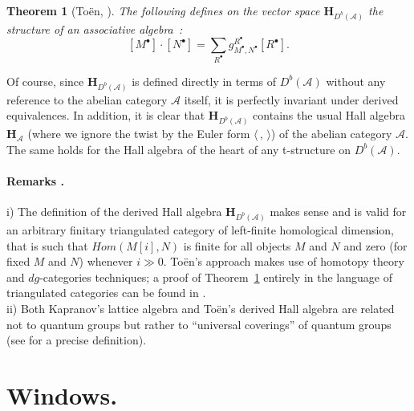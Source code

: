 \documentclass[a4paper,10pt]{amsart}
\def\H{\mathbf{H}}
\def\A{\mathcal{A}}
\newtheorem{theo}{\bf{Theorem}}[section]
\numberwithin{equation}{section}
\begin{document}
{\vspace{.1in}

\begin{theo}[To\"en, \cite{Toen}]\label{T:TOEN} The following defines on the vector space $\H_{D^b(\A)}$ the structure of an associative algebra~:
$$[M^{\bullet}] \cdot [N^{\bullet}]=\sum_{R^{\bullet}} g_{M^{\bullet},N^{\bullet}}^{R^{\bullet}}[R^{\bullet}].$$
\end{theo}

\vspace{.1in}

Of course, since $\H_{D^b(\A)}$ is defined directly in terms of $D^b(\A)$ without any reference to
the abelian category $\A$ itself, it is perfectly invariant under derived equivalences. In addition, it is clear that $\H_{D^b(\A)}$ contains the usual Hall algebra $\H_{\A}$ (where we ignore the twist by the Euler form $\langle\,,\,\rangle$) of the abelian category $\A$. The same holds for the Hall algebra of the heart of any t-structure on $D^b(\A)$.

\vspace{.15in}

\addtocounter{theo}{1}
\paragraph{\textbf{Remarks \thetheo.}} i) The definition of the derived Hall algebra $\H_{D^b(\A)}$ makes sense and is valid for an arbitrary finitary triangulated category of left-finite homological dimension, that is such that ${Hom}(M[i],N)$ is finite for all objects $M$ and $N$ and zero (for fixed $M$ and $N$) whenever $i \gg 0$. To\"en's approach makes use of homotopy theory and $dg$-categories techniques; a proof of Theorem~\ref{T:TOEN} entirely in the language of triangulated categories can be found in \cite{XiaoXu}.\\
ii) Both Kapranov's lattice algebra and To\"en's derived Hall algebra are related not to quantum groups but rather to ``universal coverings'' of quantum groups (see \cite{Kap2} for a precise definition).

\newpage

\section*{Windows.}

\vspace{.2in}

}
\end{document}
